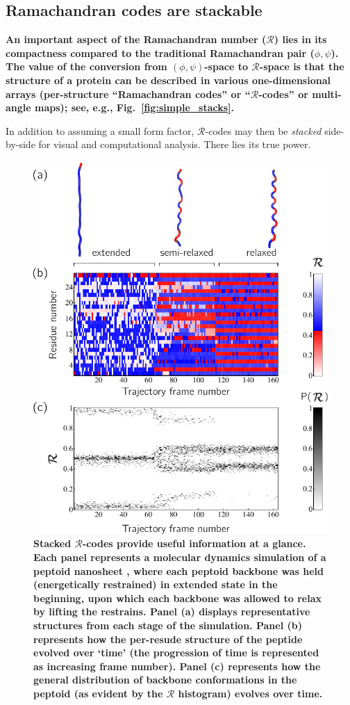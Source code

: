 \documentclass[fleqn,10pt,lineno]{wlpeerj} %
\newcommand{\Fig}[1]{Fig.~\ref{#1}}
\newcommand{\n}[1]{{\textbf{\color{red}#1}}}
\newcommand{\rr}{$\mathcal{R}$\xspace}
\begin{document}

\subsection*{Ramachandran codes are stackable}

\n{An important aspect of the Ramachandran number ($\mathcal{R}$) lies in its compactness compared to the traditional Ramachandran pair ($\phi,\psi$). The value of the conversion from $(\phi,\psi)$-space to \rr-space is that the structure of a protein can be described in various one-dimensional arrays (per-structure ``Ramachandran codes'' or ``$\mathcal{R}$-codes'' or multi-angle maps); see, e.g., \Fig{fig:simple_stacks}.} 

In addition to assuming a small form factor, $\mathcal{R}$-codes may then be \textit{stacked} side-by-side for visual and computational analysis. There lies its true power.


\begin{figure}[t!]
\centering
\includegraphics[width=0.65\linewidth]{backmap_fig6.pdf}
\caption{\textbf{Stacked $\mathcal{R}$-codes provide useful information at a glance.} \n{Each panel represents a molecular dynamics simulation of a peptoid nanosheet \citep{Mannige2016}, where  each peptoid backbone was held (energetically restrained) in extended state in the beginning, upon which each backbone was allowed to relax by lifting the restrains. Panel (a) displays representative structures from each stage of the simulation. Panel (b) represents how the per-resude structure of the peptide evolved over `time' (the progression of time is represented as increasing frame number). Panel (c) represents how the general distribution of backbone conformations in the peptoid (as evident by the \rr histogram) evolves over time.}\label{fig:complex_stacks}} 
\end{figure}
\end{document}
